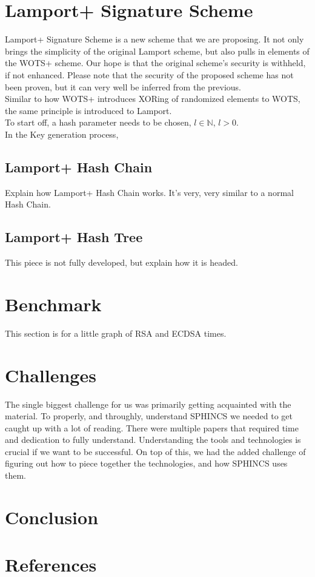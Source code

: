 \documentclass[]{scrartcl}
\begin{document}
\section*{Lamport+ Signature Scheme}
Lamport+ Signature Scheme is a new scheme that we are proposing. It not only brings the simplicity of the original Lamport scheme, but also pulls in elements of the WOTS+ scheme. Our hope is that the original scheme's security is withheld, if not enhanced. Please note that the security of the proposed scheme has not been proven, but it can very well be inferred from the previous.\\
Similar to how WOTS+ introduces XORing of randomized elements to WOTS, the same principle is introduced to Lamport.\\
To start off, a hash parameter needs to be chosen, $l \in \mathbb{N}$, $l > 0$. \\
In the Key generation process, 



\subsection*{Lamport+ Hash Chain}
Explain how Lamport+ Hash Chain works. It's very, very similar to a normal Hash Chain.

\subsection*{Lamport+ Hash Tree}
This piece is not fully developed, but explain how it is headed.

\section*{Benchmark}
This section is for a little graph of RSA and ECDSA times.

\section*{Challenges}
The single biggest challenge for us was primarily getting acquainted with the material. To properly, and throughly, understand SPHINCS we needed to get caught up with a lot of reading. There were multiple papers that required time and dedication to fully understand. Understanding the tools and technologies is crucial if we want to be successful. On top of this, we had the added challenge of figuring out how to piece together the technologies, and how SPHINCS uses them.

\section*{Conclusion}

\section*{References}
\end{document}
